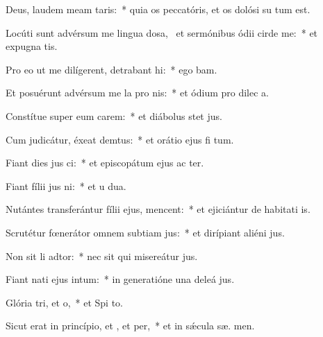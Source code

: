\item Deus, laudem meam  taris:~* quia os peccatóris, et os dolósi su  tum est.
\item Locúti sunt advérsum me lingua dosa,~\pscross{} et sermónibus ódii cirde me:~* et expugna  tis.
\item Pro eo ut me dilígerent, detrabant hi:~* ego  bam.
\item Et posuérunt advérsum me la pro nis:~* et ódium pro dilec a.
\item Constítue super eum carem:~* et diábolus stet   jus.
\item Cum judicátur, éxeat demtus:~* et orátio ejus fi  tum.
\item Fiant dies jus ci:~* et episcopátum ejus ac ter.
\item Fiant fílii jus ni:~* et u  dua.
\item Nutántes transferántur fílii ejus,  mencent:~* et ejiciántur de habitati is.
\item Scrutétur fœnerátor omnem subtiam jus:~* et dirípiant aliéni  jus.
\item Non sit li adtor:~* nec sit qui misereátur  jus.
\item Fiant nati ejus  intum:~* in generatióne una deleá  jus.
\item Glória tri, et o,~* et Spi to.
\item Sicut erat in princípio, et , et per,~* et in sǽcula sæ. men.
